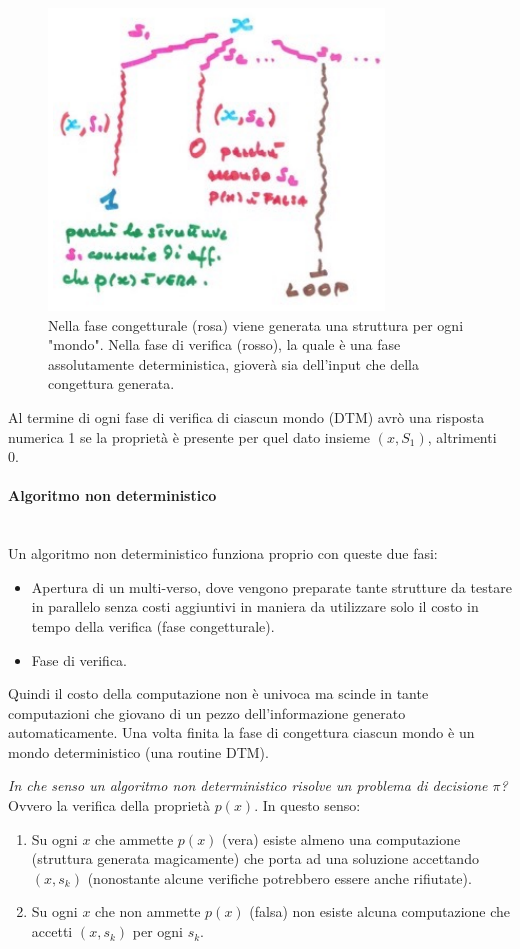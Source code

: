 \documentclass{article}
\begin{document}
\begin{figure}[H]
    \centering
    \includegraphics[scale=0.6]{images/dinamica_albero.png}
    \caption{Nella fase congetturale (rosa) viene generata una struttura per ogni "mondo".
        Nella fase di verifica (rosso), la quale è una fase assolutamente deterministica,
        gioverà sia dell'input che della congettura generata.}
\end{figure}
Al termine di ogni fase di verifica di ciascun mondo (DTM) avrò una risposta numerica
1 se la proprietà è presente per quel dato insieme $(x,S_1)$, altrimenti 0.

\paragraph{Algoritmo non deterministico}\mbox{}\\
Un algoritmo non deterministico funziona proprio con queste due fasi:
\begin{itemize}
    \item Apertura di un multi-verso, dove vengono preparate tante strutture
          da testare in parallelo senza costi aggiuntivi in maniera da utilizzare
          solo il costo in tempo della verifica (fase congetturale).
    \item Fase di verifica.
\end{itemize}
Quindi il costo della computazione non è univoca ma scinde in tante computazioni che
giovano di un pezzo dell'informazione generato automaticamente. Una volta finita la fase
di congettura ciascun mondo è un mondo deterministico (una routine DTM).

\textit{In che senso un algoritmo non deterministico risolve un problema
    di decisione $\pi$?} Ovvero la verifica della proprietà $p(x)$.
In questo senso:
\begin{enumerate}
    \item Su ogni $x$ che ammette $p(x)$ (vera) esiste
          almeno una computazione (struttura generata magicamente) che porta ad una
          soluzione accettando $(x,s_k)$ (nonostante alcune verifiche potrebbero
          essere anche rifiutate).

    \item Su ogni $x$ che non ammette $p(x)$ (falsa) non esiste alcuna
          computazione che accetti $(x,s_k)$ per ogni $s_k$.
\end{enumerate}
\end{document}
